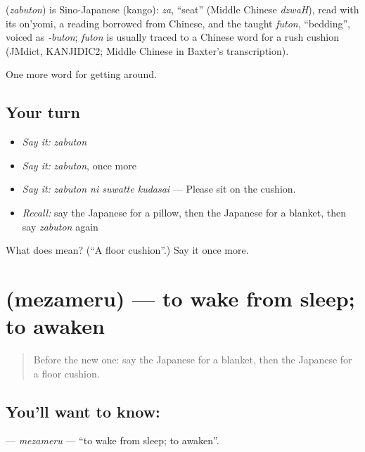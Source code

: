 \begin{cousinweb}
\textbf{} (\emph{zabuton}) is Sino-Japanese (kango): \emph{za}, \textquotedblleft{}seat\textquotedblright{} (Middle Chinese \emph{dzwaH}), read with its on'yomi, a reading borrowed from Chinese, and the taught \emph{futon}, \textquotedblleft{}bedding\textquotedblright{}, voiced as \emph{-buton}; \emph{futon} is usually traced to a Chinese word for a rush cushion (JMdict, KANJIDIC2; Middle Chinese in Baxter's transcription).
\end{cousinweb}

\begin{grammarlens}[title={What you've built}]
One more word for getting around.
\end{grammarlens}

\subsection*{Your turn}
\begin{itemize}
\raggedright
  \item \emph{Say it:} \emph{zabuton}
  \item \emph{Say it:} \emph{zabuton}, once more
  \item \emph{Say it:} \emph{zabuton ni suwatte kudasai} — Please sit on the cushion.
  \item \emph{Recall:} say the Japanese for a pillow, then the Japanese for a blanket, then say \emph{zabuton} again
\end{itemize}

\begin{tcolorbox}[breakable,colback=teal!4,colframe=teal!35!black,title={Before you move on}]
What does  mean? (\textquotedblleft{}A floor cushion\textquotedblright{}.) Say it once more.
\end{tcolorbox}
\section[\texorpdfstring{\ja{めざめる} (mezameru)}{めざめる (mezameru)}]{ (mezameru) — to wake from sleep; to awaken}

\label{lesson:JA-C399-mezameru}



\begin{quote}
Before the new one: say the Japanese for a blanket, then the Japanese for a floor cushion.
\end{quote}

\subsection*{You'll want to know: }
\textbf{} — \emph{mezameru} — \textquotedblleft{}to wake from sleep; to awaken\textquotedblright{}.

